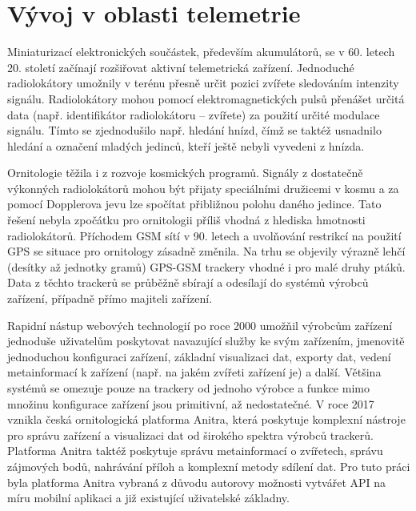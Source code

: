 \section{Vývoj v oblasti telemetrie}

Miniaturizací elektronických součástek, především akumulátorů, se v 60. letech 20. století začínají rozšiřovat aktivní telemetrická zařízení. Jednoduché radiolokátory umožnily v terénu přesně určit pozici zvířete sledováním intenzity signálu. Radiolokátory mohou pomocí elektromagnetických pulsů přenášet určitá data (např. identifikátor radiolokátoru -- zvířete) za použití určité modulace signálu. Tímto se zjednodušilo např. hledání hnízd, čímž se taktéž usnadnilo hledání a označení mladých jedinců, kteří ještě nebyli vyvedeni z hnízda.


Ornitologie těžila i z rozvoje kosmických programů. Signály z dostatečně výkonných radiolokátorů mohou být přijaty speciálními družicemi v kosmu a za pomocí Dopplerova jevu lze spočítat přibližnou polohu daného jedince. Tato řešení nebyla zpočátku pro ornitologii příliš vhodná z hlediska hmotnosti radiolokátorů. Příchodem GSM sítí v 90. letech a uvolňování restrikcí na použití GPS se situace pro ornitology zásadně změnila. Na trhu se objevily výrazně lehčí (desítky až jednotky gramů) GPS-GSM trackery vhodné i pro malé druhy ptáků. Data z těchto trackerů se průběžně sbírají a odesílají do systémů výrobců zařízení, případně přímo majiteli zařízení.

Rapidní nástup webových technologií po roce 2000 umožňil výrobcům zařízení jednoduše uživatelům poskytovat navazující služby ke svým zařízením, jmenovitě jednoduchou konfiguraci zařízení, základní visualizaci dat, exporty dat, vedení metainformací k zařízení (např. na jakém zvířeti zařízení je) a další. Většina systémů se omezuje pouze na trackery od jednoho výrobce a funkce mimo množinu konfigurace zařízení jsou primitivní, až nedostatečné. V roce 2017 vznikla česká ornitologická platforma Anitra, která poskytuje komplexní nástroje pro správu zařízení a visualizaci dat od širokého spektra výrobců trackerů. Platforma Anitra taktéž poskytuje správu metainformací o zvířetech, správu zájmových bodů, nahrávání příloh a komplexní metody sdílení dat. Pro tuto práci byla platforma Anitra vybraná z důvodu autorovy možnosti vytvářet API na míru mobilní aplikaci a již existující uživatelské základny.


